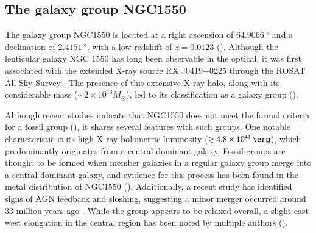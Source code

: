 \subsection{The galaxy group NGC1550}\label{sec:ngc1550}
The galaxy group NGC1550 is located at a right ascension of \(\SI{64.9066}{\degree}\) and a declination of \(\SI{2.4151}{\degree}\), with a low redshift of \(z = 0.0123\) (\cite{Reiprich_2002}). Although the lenticular galaxy NGC 1550 has long been observable in the optical, it was first associated with the extended X-ray source RX J0419+0225 through the ROSAT All-Sky Survey \cite{Bohringer_2000}. The presence of this extensive X-ray halo, along with its considerable mass (\(\sim 2 \times 10^{13} M_{\odot}\)), led to its classification as a galaxy group (\cite{Kawaharada_2003}).

Although recent studies indicate that NGC1550 does not meet the formal criteria for a fossil group (\cite{Sun_2003}), it shares several features with such groups. One notable characteristic is its high X-ray bolometric luminosity (\(\gtrsim \SI{4.8e41}{\erg}\)), which predominantly originates from a central dominant galaxy. Fossil groups are thought to be formed when member galaxies in a regular galaxy group merge into a central dominant galaxy, and evidence for this process has been found in the metal distribution of NGC1550 (\cite{Kawaharada_2009, Sato_2010}). Additionally, a recent study has identified signs of AGN feedback and sloshing, suggesting a minor merger occurred around 33 million years ago \cite{Kolokythas_2020}. While the group appears to be relaxed overall, a slight east-west elongation in the central region has been noted by multiple authors (\cite{Kolokythas_2020, Sun_2003}).
%
